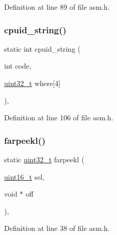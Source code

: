 Definition at line 89 of file asm.\+h.

\mbox{\label{a00014_a9091114e1347758f7e3cd993169a5764_a9091114e1347758f7e3cd993169a5764}} 
\subsubsection{\texorpdfstring{cpuid\+\_\+string()}{cpuid\_string()}}
{\footnotesize\ttfamily static int cpuid\+\_\+string (\begin{DoxyParamCaption}\item[{int}]{code,  }\item[{\hyperlink{a00038_a435d1572bf3f880d55459d9805097f62_a435d1572bf3f880d55459d9805097f62}{uint32\+\_\+t}}]{where\mbox{[}4\mbox{]} }\end{DoxyParamCaption})\hspace{0.3cm}{\ttfamily [inline]}, {\ttfamily [static]}}



Definition at line 106 of file asm.\+h.

\mbox{\label{a00014_aee0779a0581136320f91a72c4d6b5b90_aee0779a0581136320f91a72c4d6b5b90}} 
\subsubsection{\texorpdfstring{farpeekl()}{farpeekl()}}
{\footnotesize\ttfamily static \hyperlink{a00038_a435d1572bf3f880d55459d9805097f62_a435d1572bf3f880d55459d9805097f62}{uint32\+\_\+t} farpeekl (\begin{DoxyParamCaption}\item[{\hyperlink{a00038_adf4d876453337156dde61095e1f20223_adf4d876453337156dde61095e1f20223}{uint16\+\_\+t}}]{sel,  }\item[{void $\ast$}]{off }\end{DoxyParamCaption})\hspace{0.3cm}{\ttfamily [inline]}, {\ttfamily [static]}}



Definition at line 38 of file asm.\+h.

\mbox{\label{a00014_a4e7b04b927c6dca2d20f54a5c14a01d6_a4e7b04b927c6dca2d20f54a5c14a01d6}} 
